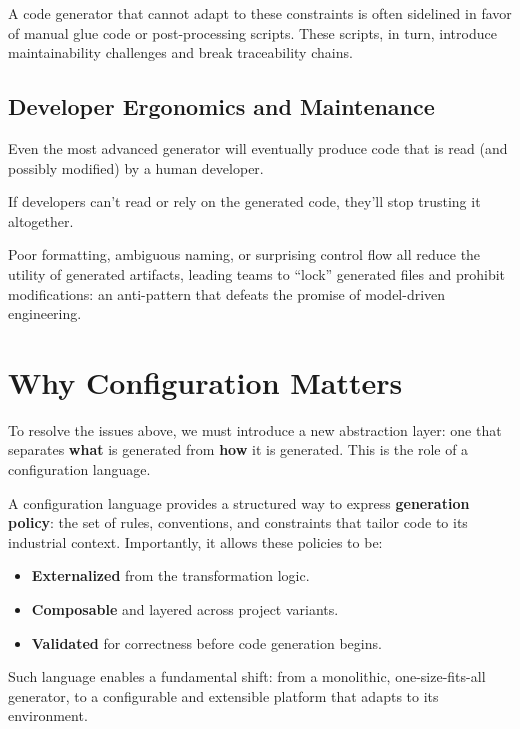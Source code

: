 A code generator that cannot adapt to these constraints is often sidelined in favor of manual glue code or post-processing scripts. These scripts, in turn, introduce maintainability challenges and break traceability chains.

\subsection*{Developer Ergonomics and Maintenance}

Even the most advanced generator will eventually produce code that is read (and possibly modified) by a human developer. 

\begin{tcolorbox}[colback=green!8]
	If developers can’t read or rely on the generated code, they’ll stop trusting it altogether.
\end{tcolorbox}

Poor formatting, ambiguous naming, or surprising control flow all reduce the utility of generated artifacts, leading teams to “lock” generated files and prohibit modifications: an anti-pattern that defeats the promise of model-driven engineering.

\section{Why Configuration Matters}
\label{sec:why_configuration_matters}

To resolve the issues above, we must introduce a new abstraction layer: one that separates \textbf{what} is generated from \textbf{how} it is generated. This is the role of a configuration language.

A configuration language provides a structured way to express \textbf{generation policy}: the set of rules, conventions, and constraints that tailor code to its industrial context. Importantly, it allows these policies to be:

\begin{itemize}
	\item \textbf{Externalized} from the transformation logic.
	\item \textbf{Composable} and layered across project variants.
	\item \textbf{Validated} for correctness before code generation begins.
\end{itemize}

Such language enables a fundamental shift: from a monolithic, one-size-fits-all generator, to a configurable and extensible platform that adapts to its environment.

